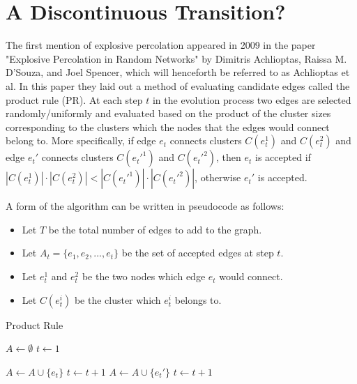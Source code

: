 \section{A Discontinuous Transition?}
The first mention of explosive percolation appeared in 2009 in the paper "Explosive Percolation in Random Networks" \cite{Achlioptas_1} by Dimitris Achlioptas, Raissa M. D’Souza, and Joel Spencer, which will henceforth be referred to as Achlioptas et al.
In this paper they laid out a method of evaluating candidate edges called the product rule (PR).
At each step $t$ in the evolution process two edges are selected randomly/uniformly and evaluated based on the product of the cluster sizes corresponding to the clusters which the nodes that the edges would connect belong to.
More specifically, if edge $e_t$ connects clusters $C(e_t^1)$ and $C(e_t^2)$ and edge $e_t'$ connects clusters $C(e_t'^1)$ and $C(e_t'^2)$, then $e_t$ is accepted if $|C(e_t^1)| \cdot |C(e_t^2)| < |C(e_t'^1)| \cdot |C(e_t'^2)|$, otherwise $e_t'$ is accepted.

A form of the algorithm can be written in pseudocode as follows:
\begin{itemize}
	\item Let $T$ be the total number of edges to add to the graph.
	\item Let $A_t = \{e_1, e_2, ..., e_t\}$ be the set of accepted edges at step $t$.
	\item Let $e_t^1$ and $e_t^2$ be the two nodes which edge $e_t$ would connect.
	\item Let $C(e_t^i)$ be the cluster which $e_t^i$ belongs to.
\end{itemize}

\begin{algorithm}
	\caption{Product Rule}\label{Product-Rule}
	\begin{algorithmic}[1]
		\State $A \gets \emptyset$
		\State $t \gets 1$

				\State $A \gets A \cup \{e_t\}$
				\State $t \gets t+1$
			\Else
				\State $A \gets A \cup \{e_t'\}$
				\State $t \gets t+1$
			\EndIf
		\EndWhile
	\EndProcedure
	\end{algorithmic}
\end{algorithm}

